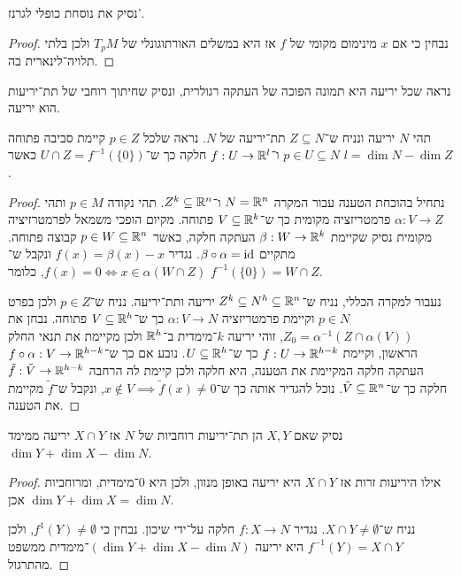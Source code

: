 \subquestion{}
נסיק את נוסחת כופלי לגרנז'.
\begin{proof}
	נבחין כי אם $x$ מינימום מקומי של $f$ אז היא במשלים האורתוגונלי של $T_p M$ ולכן בלתי תלויה־לינארית בה.
\end{proof}

\question{}
נראה שכל יריעה היא תמונה הפוכה של העתקה רגולרית,
ונסיק שחיתוך רוחבי של תת־יריעות הוא יריעה.

\subquestion{}
תהי $N$ יריעה ונניח ש־$Z \subseteq N$ תת־יריעה של $N$.
נראה שלכל $p \in Z$ קיימת סביבה פתוחה $p \in U \subseteq N$ ו־$f : U \to \mathbb{R}^l$ חלקה כך ש־$U \cap Z = f^{-1}(\{ 0 \})$ כאשר $l = \dim N - \dim Z$.
\begin{proof}
	נתחיל בהוכחת הטענה עבור המקרה $N = \mathbb{R}^n$ ו־$Z^k \subseteq \mathbb{R}^n$.
	תהי נקודה $p \in M$ ותהי $\alpha : V \to Z$ פרמטריזציה מקומית כך ש־$V \subseteq \mathbb{R}^k$ פתוחה.
	מקיום הופכי משמאל לפרמטרזיציה מקומית נסיק שקיימת $\beta : W \to \mathbb{R}^k$ העתקה חלקה, כאשר $p \in W \subseteq \mathbb{R}^n$ קבוצה פתוחה.
	מתקיים $\beta \circ \alpha = \operatorname{id}$.
	נגדיר $f(x) = \beta(x) - x$ ונקבל ש־$f(x) = 0 \iff x \in \alpha(W \cap Z)$, כלומר $f^{-1}(\{ 0 \}) = W \cap Z$.

	נעבור למקרה הכללי, נניח ש־$Z^k \subseteq N^h \subseteq \mathbb{R}^n$ יריעה ותת־יריעה.
	נניח ש־$p \in Z$ ולכן בפרט $p \in N$ וקיימת פרמטריזציה $\alpha : V \to N$ כך ש־$V \subseteq \mathbb{R}^h$ פתוחה.
	נבחן את $Z_0 = \alpha^{-1}(Z \cap \alpha(V))$, זוהי יריעה $k$־מימדית ב־$\mathbb{R}^h$ ולכן מקיימת את תנאי החלק הראשון, וקיימת $f : U \to \mathbb{R}^{h - k}$ כך ש־$U \subseteq \mathbb{R}^h$.
	נובע אם כך ש־$f \circ \alpha : V \to \mathbb{R}^{h - k}$ העתקה חלקה המקיימת את הטענה, היא חלקה ולכן קיימת לה הרחבה $\tilde{f} : \tilde{V} \to \mathbb{R}^{h - k}$ חלקה כך ש־$\tilde{V} \subseteq \mathbb{R}^n$.
	נוכל להגדיר אותה כך ש־$x \notin V \implies \tilde{f}(x) \ne 0$, ונקבל ש־$\tilde{f}$ מקיימת את הטענה.
\end{proof}

\subquestion{}
נסיק שאם $X, Y$ הן תת־יריעות רוחביות של $N$ אז $X \cap Y$ יריעה ממימד $\dim Y + \dim X - \dim N$.
\begin{proof}
	אילו היריעות זרות אז $X \cap Y$ היא יריעה באופן מנוון, ולכן היא $0$־מימדית, ומרוחביות אכן $\dim Y + \dim X = \dim N$.

	נניח ש־$X \cap Y \ne \emptyset$.
	נגדיר $f : X \to N$ חלקה על־ידי שיכון.
	נבחין כי $f^{1}(Y) \ne \emptyset$, ולכן $f^{-1}(Y) = X \cap Y$ היא יריעה $(\dim Y + \dim X - \dim N)$־מימדית ממשפט מהתרגול.
\end{proof}

